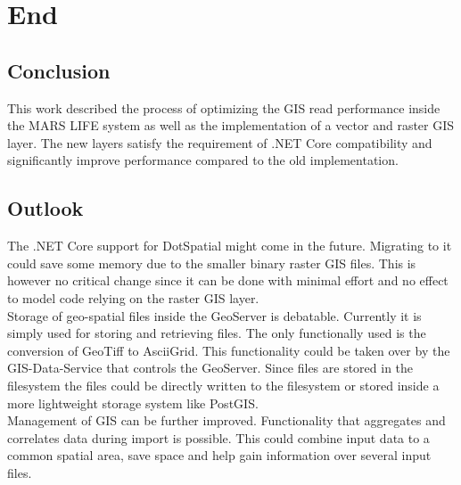 
\chapter{End}



\section{Conclusion}
This work described the process of optimizing the GIS read performance inside the MARS LIFE system as well as the implementation of a vector and raster GIS layer. The new layers satisfy the requirement of .NET Core compatibility and significantly improve performance compared to the old implementation.


\section{Outlook}
The .NET Core support for DotSpatial might come in the future. Migrating to it could save some memory due to the smaller binary raster GIS files. This is however no critical change since it can be done with minimal effort and no effect to model code relying on the raster GIS layer.\\
Storage of geo-spatial files inside the GeoServer is debatable. Currently it is simply used for storing and retrieving files. The only functionally used is the conversion of GeoTiff to AsciiGrid. This functionality could be taken over by the GIS-Data-Service that controls the GeoServer. Since files are stored in the filesystem the files could be directly written to the filesystem or stored inside a more lightweight storage system like PostGIS.\\
Management of GIS can be further improved. Functionality that aggregates and correlates data during import is possible. This could combine input data to a common spatial area, save space and help gain information over several input files.
